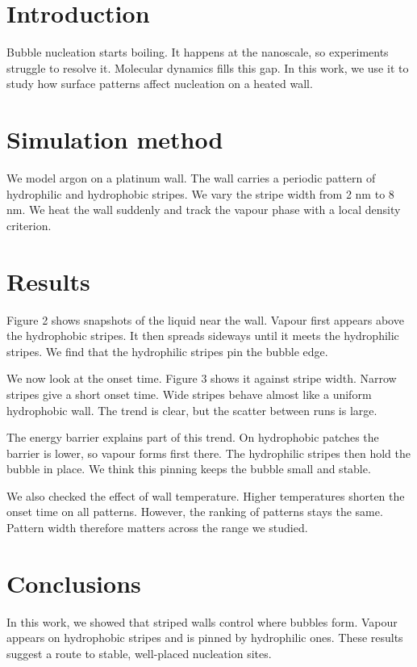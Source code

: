 \documentclass{article}
\begin{document}
\section{Introduction}
Bubble nucleation starts boiling. It happens at the nanoscale, so experiments struggle to resolve it. Molecular dynamics fills this gap. In this work, we use it to study how surface patterns affect nucleation on a heated wall.

\section{Simulation method}
We model argon on a platinum wall. The wall carries a periodic pattern of hydrophilic and hydrophobic stripes. We vary the stripe width from 2 nm to 8 nm. We heat the wall suddenly and track the vapour phase with a local density criterion.

\section{Results}
Figure 2 shows snapshots of the liquid near the wall. Vapour first appears above the hydrophobic stripes. It then spreads sideways until it meets the hydrophilic stripes. We find that the hydrophilic stripes pin the bubble edge.

We now look at the onset time. Figure 3 shows it against stripe width. Narrow stripes give a short onset time. Wide stripes behave almost like a uniform hydrophobic wall. The trend is clear, but the scatter between runs is large.

The energy barrier explains part of this trend. On hydrophobic patches the barrier is lower, so vapour forms first there. The hydrophilic stripes then hold the bubble in place. We think this pinning keeps the bubble small and stable.

We also checked the effect of wall temperature. Higher temperatures shorten the onset time on all patterns. However, the ranking of patterns stays the same. Pattern width therefore matters across the range we studied.

\section{Conclusions}
In this work, we showed that striped walls control where bubbles form. Vapour appears on hydrophobic stripes and is pinned by hydrophilic ones. These results suggest a route to stable, well-placed nucleation sites.
\end{document}
